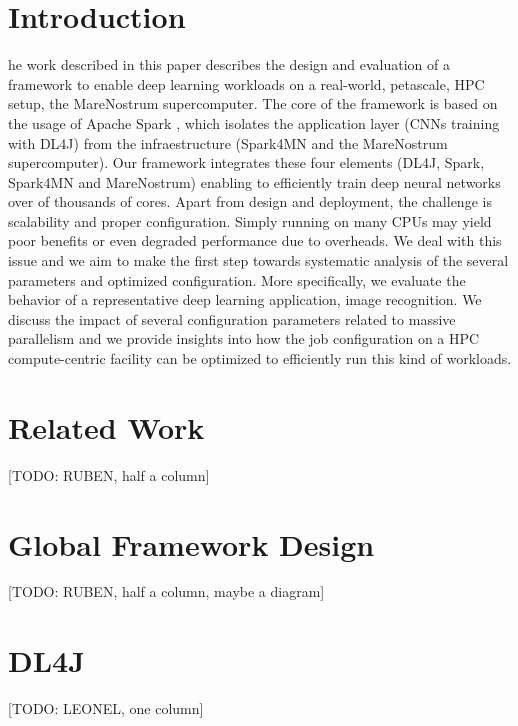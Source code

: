 \documentclass[journal]{IEEEtran}
\begin{document}





\section{Introduction}

 he work described in this paper describes the design and evaluation of a framework to enable deep learning workloads on a real-world, petascale, HPC setup, the MareNostrum supercomputer. The core of the framework is based on the usage of Apache Spark \cite{spark}, which isolates the application layer (CNNs training with DL4J) from the infraestructure (Spark4MN and the MareNostrum supercomputer). Our framework integrates these four elements (DL4J, Spark, Spark4MN and MareNostrum) enabling to efficiently train deep neural networks over of thousands of cores. Apart from design and deployment, the challenge is scalability and proper configuration. Simply running on many CPUs may yield poor benefits or even degraded performance due to overheads. We deal with this issue and we aim to make the first step towards systematic analysis of the several parameters and optimized configuration. More specifically, we evaluate the behavior of a representative deep learning application, image recognition. We discuss the impact of several configuration parameters related to massive parallelism
and we provide insights into how the job configuration on a HPC compute-centric facility can be optimized to efficiently run this kind of workloads. 

\section{Related Work}
\label{sec:rw}

[TODO: RUBEN, half a column]

\section{Global Framework Design}
\label{sec:framework}
[TODO: RUBEN, half a column, maybe a diagram]

\section{DL4J}
\label{sec:spark}
[TODO: LEONEL, one column]
\end{document}
